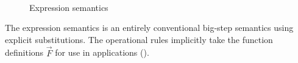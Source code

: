 \documentclass[acmsmall,screen,nonacm]{acmart}
\theoremstyle{definition}
\begin{document}
\begin{figure}[t]
  \sidebyside
  {
  }
  {
  }

  {
  }


  ~ \\[0.5em]


  \caption{Expression semantics}
  \label{fig:opsem-expression}
\end{figure}

The expression semantics is an entirely conventional big-step
semantics using explicit substitutions.
%
The operational rules implicitly take the function definitions
$\vec{F}$ for use in applications ().
\end{document}
